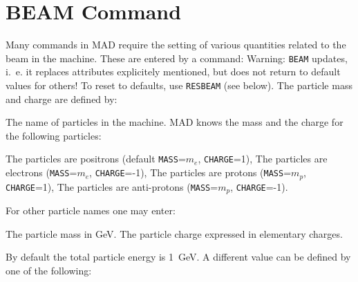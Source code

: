  
\section{BEAM Command}
\label{S-BEAM}
Many commands in MAD require the setting of various quantities related
to the beam in the machine.
These are entered by a  command:
Warning: {\tt BEAM} updates, i.~e. it replaces attributes explicitely
mentioned, but does not return to default values for others!
To reset to defaults, use {\tt RESBEAM} (see below).
The particle mass and charge are defined by:
\begin{mylist}
The name of particles in the machine.
MAD knows the mass and the charge for the following particles:
\begin{mylist}
The particles are positrons (default \hbox{\tt MASS}=\(m_e\),
\hbox{\tt CHARGE}=1),
The particles are electrons (\hbox{\tt MASS}=\(m_e\),
\hbox{\tt CHARGE}=-1),
The particles are protons (\hbox{\tt MASS}=\(m_p\),
\hbox{\tt CHARGE}=1),
The particles are anti-protons (\hbox{\tt MASS}=\(m_p\),
\hbox{\tt CHARGE}=-1).
\end{mylist}
\end{mylist}
For other particle names one may enter:
\begin{mylist}
The particle mass in GeV.
The particle charge  expressed in elementary charges.
\end{mylist}
By default the total particle energy is 1~GeV.
A different value can be defined by one of the following:
